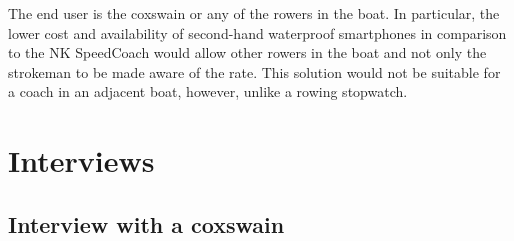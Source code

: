 \documentclass[11pt,twoside,a4paper]{report}
\begin{document}
The end user is the coxswain or any of the rowers in the boat. In particular, the lower cost and availability of second-hand waterproof smartphones in comparison to the NK SpeedCoach would allow other rowers in the boat and not only the strokeman to be made aware of the rate. This solution would not be suitable for a coach in an adjacent boat, however, unlike a rowing stopwatch.

\section{Interviews}

\subsection{Interview with a coxswain}
\end{document}
